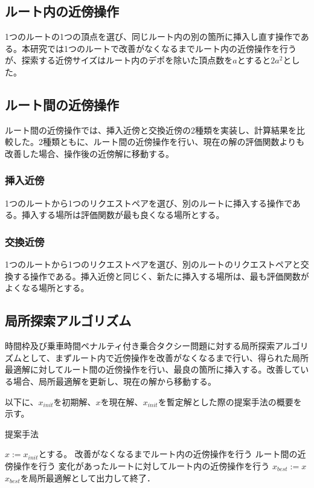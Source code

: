 \subsection{ルート内の近傍操作}
1つのルートの1つの頂点を選び、同じルート内の別の箇所に挿入し直す操作である。本研究では1つのルートで改善がなくなるまでルート内の近傍操作を行うが、探索する近傍サイズはルート内のデポを除いた頂点数を$a$とすると$2a^2$とした。

\subsection{ルート間の近傍操作}
ルート間の近傍操作では、挿入近傍と交換近傍の2種類を実装し、計算結果を比較した。2種類ともに、ルート間の近傍操作を行い、現在の解の評価関数よりも改善した場合、操作後の近傍解に移動する。
\subsubsection{挿入近傍}
1つのルートから1つのリクエストペアを選び、別のルートに挿入する操作である。挿入する場所は評価関数が最も良くなる場所とする。
\subsubsection{交換近傍}
1つのルートから1つのリクエストペアを選び、別のルートのリクエストペアと交換する操作である。挿入近傍と同じく、新たに挿入する場所は、最も評価関数がよくなる場所とする。
\subsection{局所探索アルゴリズム}
時間枠及び乗車時間ペナルティ付き乗合タクシー問題に対する局所探索アルゴリズムとして、まずルート内で近傍操作を改善がなくなるまで行い、得られた局所最適解に対してルート間の近傍操作を行い、最良の箇所に挿入する。改善している場合、局所最適解を更新し、現在の解から移動する。

以下に、$x_{init}$を初期解、$x$を現在解、$x_{init}$を暫定解とした際の提案手法の概要を示す。
\begin{algorithm}
 \caption{提案手法}
 \label{algo1}
 \begin{algorithmic}[1]%
  \STATE $x := x_{init}$とする。
  \STATE 改善がなくなるまでルート内の近傍操作を行う
  \STATE ルート間の近傍操作を行う
  \STATE 変化があったルートに対してルート内の近傍操作を行う
  \STATE  $x_{best} := x$
  \ENDIF
  \STATE $x_{best}$を局所最適解として出力して終了．
 \end{algorithmic}
\end{algorithm}
